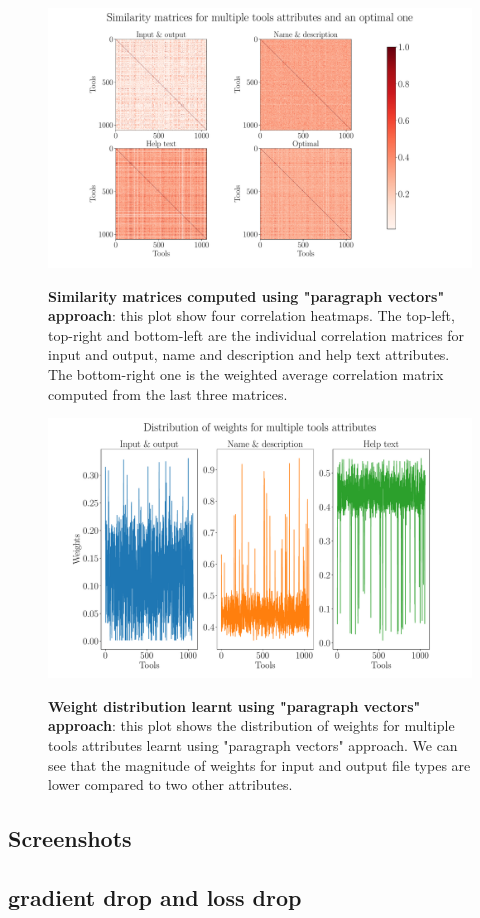 \begin{figure}[h]
\begin{centering}
    {\includegraphics[scale=0.35]{figures/Similarity_matrices_doc2vec.pdf}}
    \caption[Similarity matrices using doc2vec]{\textbf{Similarity matrices computed using "paragraph vectors" approach}: this plot show four correlation heatmaps. The top-left, top-right and bottom-left are the individual correlation matrices for input and output, name and description and help text attributes. The bottom-right one is the weighted average correlation matrix computed from the last three matrices.}
\end{centering}
\end{figure}

\begin{figure}[h]
\begin{centering}
    {\includegraphics[scale=0.35]{figures/Weights_doc2vec.pdf}}
    \caption[Weights distribution for doc2vec]{\textbf{Weight distribution learnt using "paragraph vectors" approach}: this plot shows the distribution of weights for multiple tools attributes learnt using "paragraph vectors" approach. We can see that the magnitude of weights for input and output file types are lower compared to two other attributes. }
\end{centering}
\end{figure}

\subsection{Screenshots}
\subsection{gradient drop and loss drop}


